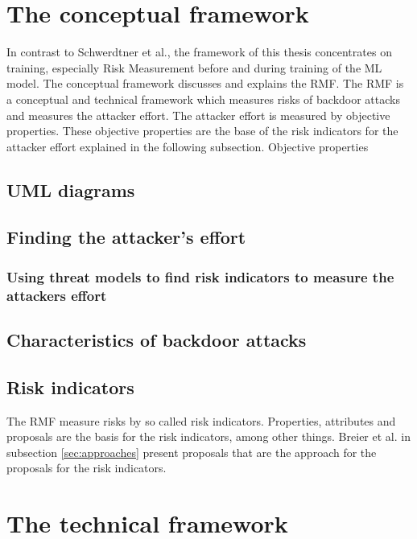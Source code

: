 \section{The conceptual framework}
\label{sec:conFrame}

In contrast to Schwerdtner et al., the framework of this thesis concentrates on training, especially Risk Measurement before and during training of the ML model.
The conceptual framework discusses and explains the RMF. The RMF is a conceptual and technical framework which measures risks of backdoor attacks and measures the attacker effort. The attacker effort
is measured by objective properties. These objective properties are the base of the risk indicators for the attacker effort explained in the following subsection. Objective properties

\subsection{UML diagrams}


\subsection{Finding the attacker's effort}

\subsubsection*{Using threat models to find risk indicators to measure the attackers effort}

\subsection{Characteristics of backdoor attacks}

\subsection{Risk indicators}
\label{sec:risk_indicators}

The RMF measure risks by so called risk indicators. Properties, attributes and proposals are the basis for the risk indicators, among other things. Breier et al. in subsection \ref{sec:approaches} present proposals that are the approach for the proposals for the risk indicators.

\newpage

\section{The technical framework}
\label{sec:techFrame}

